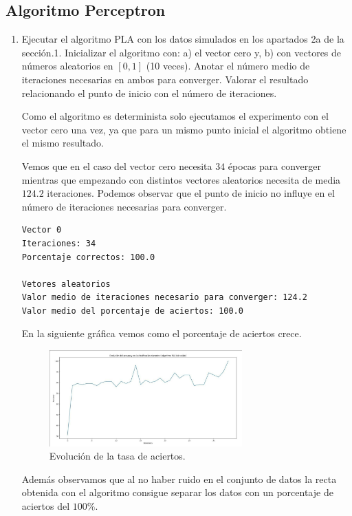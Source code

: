 \documentclass[size=a4, parskip=half, titlepage=false, toc=flat, toc=bib, 12pt]{scrartcl}
\begin{document}
\subsection{Algoritmo Perceptron}
\begin{enumerate}
\item Ejecutar el algoritmo PLA con los datos simulados en los apartados 2a de la
sección.1. Inicializar el algoritmo con: a) el vector cero y, b) con vectores de
números aleatorios en $[0, 1]$ (10 veces). Anotar el número medio de iteraciones
necesarias en ambos para converger. Valorar el resultado relacionando el punto
de inicio con el número de iteraciones.

Como el algoritmo es determinista solo ejecutamos el experimento con el vector cero una vez, ya que para un mismo punto inicial el algoritmo obtiene el mismo resultado.

Vemos que en el caso del vector cero necesita $34$ épocas para converger mientras que empezando con distintos vectores aleatorios necesita de media $124.2$ iteraciones. Podemos observar que el punto de inicio no influye en el número de iteraciones necesarias para converger.
\begin{verbatim}
Vector 0
Iteraciones: 34
Porcentaje correctos: 100.0

Vetores aleatorios
Valor medio de iteraciones necesario para converger: 124.2
Valor medio del porcentaje de aciertos: 100.0
\end{verbatim}

En la siguiente gráfica vemos como el porcentaje de aciertos crece.
\begin{figure}[H]
\centering
{}
\includegraphics[width=0.7\textwidth]{./img/accsinruido}
\caption{Evolución de la tasa de aciertos.}
\end{figure}

Además observamos que al no haber ruido en el conjunto de datos la recta obtenida con el algoritmo consigue separar los datos con un porcentaje de aciertos del $100\%$.


\end{enumerate}
\end{document}
